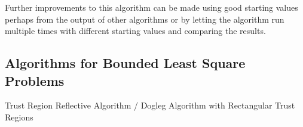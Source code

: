 Further improvements to this algorithm can be made using good starting values perhaps from the output of other algorithms or by letting the algorithm run multiple times with different starting values and comparing the results.

\subsection{Algorithms for Bounded Least Square Problems}

Trust Region Reflective Algorithm / Dogleg Algorithm with Rectangular Trust Regions



